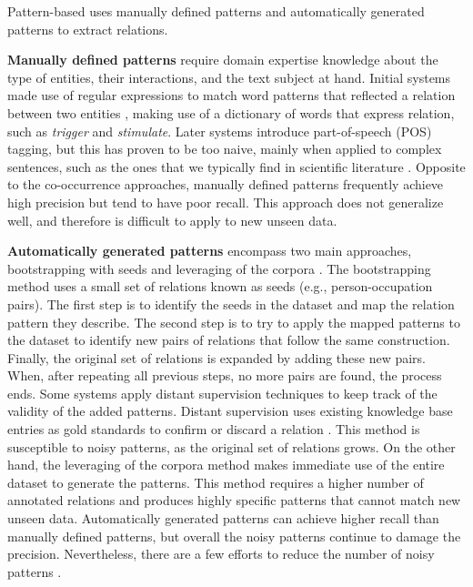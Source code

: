 Pattern-based uses manually defined patterns and automatically generated patterns to extract relations.

\textbf{Manually defined patterns} require domain expertise knowledge about the type of entities, their interactions, and the text subject at hand. 
Initial systems made use of regular expressions to match word patterns that reflected a relation between two entities \citep{smolinski2009computational}, making use of a dictionary of words that express relation, such as \textit{trigger} and \textit{stimulate}. Later systems introduce part-of-speech (POS) tagging, but this has proven to be too naive, mainly when applied to complex sentences, such as the ones that we typically find in scientific literature \citep{hao2005discovering}. Opposite to the co-occurrence approaches, manually defined patterns frequently achieve high precision but tend to have poor recall. This approach does not generalize well, and therefore is difficult to apply to new unseen data. 

\textbf{Automatically generated patterns} encompass two main approaches, bootstrapping with seeds \citep{wang2011inference} and leveraging of the corpora \citep{liu2011graphs}. 
The bootstrapping method uses a small set of relations known as seeds (e.g., person-occupation pairs). The first step is to identify the seeds in the dataset and map the relation pattern they describe. The second step is to try to apply the mapped patterns to the dataset to identify new pairs of relations that follow the same construction. Finally, the original set of relations is expanded by adding these new pairs. When, after repeating all previous steps, no more pairs are found, the process ends. Some systems apply distant supervision techniques to keep track of the validity of the added patterns. Distant supervision uses existing knowledge base entries as gold standards to confirm or discard a relation \citep{jiang2018revisiting}. This method is susceptible to noisy patterns, as the original set of relations grows.
On the other hand, the leveraging of the corpora method makes immediate use of the entire dataset to generate the patterns. This method requires a higher number of annotated relations and produces highly specific patterns that cannot match new unseen data. Automatically generated patterns can achieve higher recall than manually defined patterns, but overall the noisy patterns continue to damage the precision. Nevertheless, there are a few efforts to reduce the number of noisy patterns \citep{nguyen2010simple}. 


